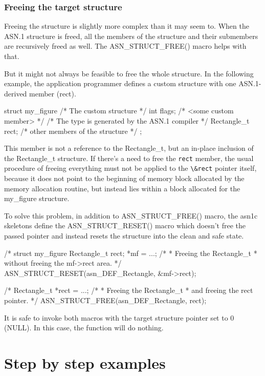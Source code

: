 \documentclass[english,oneside,12pt]{book}
\newcommand{\code}[1]{\lstinline{#1}}
\begin{document}
\subsection{\label{sub:Freeing-the-target}Freeing the target structure}

Freeing the structure is slightly more complex than it may seem to.
When the ASN.1 structure is freed, all the members of the structure
and their submembers are recursively freed as well.
The ASN\_STRUCT\_FREE() macro helps with that.

But it might not always be feasible to free the whole structure.
In the following example, the application programmer defines a custom
structure with one ASN.1-derived member (rect).
\begin{codesample}
struct my_figure {       /* The custom structure */
    int flags;           /* <some custom member> */
    /* The type is generated by the ASN.1 compiler */
    Rectangle_t rect;
    /* other members of the structure */
};
\end{codesample}
This member is not a reference to the Rectangle\_t, but an in-place inclusion
of the Rectangle\_t structure.
If there's a need to free the \code{rect} member, the usual procedure of
freeing everything must not be applied to the \code{\&rect} pointer itself,
because it does not point to the beginning of memory block allocated by
the memory allocation routine, but instead lies within a block allocated for
the my\_figure structure.

To solve this problem, in addition to ASN\_STRUCT\_FREE() macro, the asn1c
skeletons define the ASN\_STRUCT\_RESET() macro which doesn't free the passed
pointer and instead resets the structure into the clean and safe state.
\begin{codesample}
/* %
struct my_figure {
    Rectangle_t rect;
} *mf = ...;
/*
 * Freeing the Rectangle_t
 * without freeing the mf->rect area.
 */
ASN_STRUCT_RESET(asn_DEF_Rectangle, &mf->rect);
  
/* %
Rectangle_t *rect = ...;
/*
 * Freeing the Rectangle_t
 * and freeing the rect pointer.
 */
ASN_STRUCT_FREE(asn_DEF_Rectangle, rect);
\end{codesample}
It is safe to invoke both macros with the target structure pointer
set to 0 (NULL). In this case, the function will do nothing.

\chapter{\label{cha:Step-by-step-examples}Step by step examples}
\end{document}
